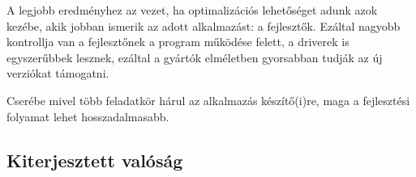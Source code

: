 A legjobb eredm\'enyhez az vezet, ha optimaliz\'aci\'os lehet\H os\'eget adunk azok kez\'ebe, akik jobban ismerik az adott alkalmaz\'ast: a fejleszt\H ok.
Ez\'altal nagyobb kontrollja van a fejleszt\H onek a program m\H uk\"od\'ese felett, a driverek is egyszer\H ubbek lesznek, ez\'altal a gy\'art\'ok elm\'eletben gyorsabban tudj\'ak az \'uj verzi\'okat t\'amogatni.

Cser\'ebe mivel t\"obb feladatk\"or h\'arul az alkalmaz\'as k\'esz\'it\H o(i)re, maga a fejleszt\'esi folyamat lehet hosszadalmasabb.

\subsection{Kiterjesztett val\'os\'ag}
